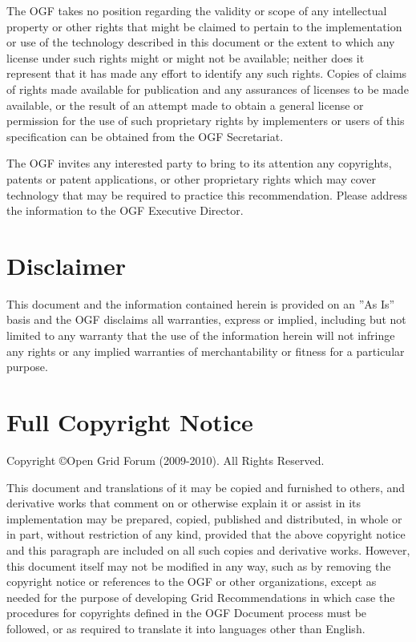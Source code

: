 \documentclass[10pt,a4paper]{article}
\begin{document}
The OGF takes no position regarding the validity or scope of any intellectual property or other rights that might be claimed to pertain to the implementation or use of the technology described in this document or the extent to which any license under such rights might or might not be available; neither does it represent that it has made any effort to identify any such rights. Copies of claims of rights made available for publication and any assurances of licenses to be made available, or the result of an attempt made to obtain a general license or permission for the use of such proprietary rights by implementers or users of this specification can be obtained from the OGF Secretariat.

The OGF invites any interested party to bring to its attention any copyrights, patents or patent applications, or other proprietary rights which may cover technology that may be required to practice this recommendation. Please address the information to the OGF Executive Director.

\section{Disclaimer}

This document and the information contained herein is provided on an ''As Is'' basis and the OGF disclaims all warranties, express or implied, including but not limited to any warranty that the use of the information herein will not infringe any rights or any implied warranties of merchantability or fitness for a particular purpose.

\section{Full Copyright Notice}

Copyright \copyright Open Grid Forum (2009-2010). All Rights Reserved.

This document and translations of it may be copied and furnished to others, and derivative works that comment on or otherwise explain it or assist in its implementation may be prepared, copied, published and distributed, in whole or in part, without restriction of any kind, provided that the above copyright notice and this paragraph are included on all such copies and derivative works. However, this document itself may not be modified in any way, such as by removing the copyright notice or references to the OGF or other organizations, except as needed for the purpose of developing Grid Recommendations in which case the procedures for copyrights defined in the OGF Document process must be followed, or as required to translate it into languages other than English.
\end{document}

